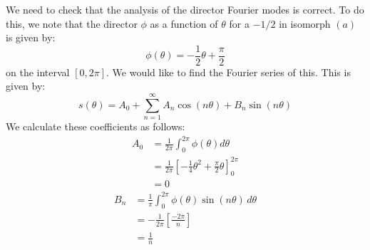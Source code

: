 \documentclass[reqno]{article}
\begin{document}
We need to check that the analysis of the director Fourier modes is correct.
To do this, we note that the director $\phi$ as a function of $\theta$ for a $-1/2$ in isomorph $(a)$ is given by:
\begin{equation}
    \phi(\theta) = -\frac12 \theta + \frac{\pi}{2}
\end{equation}
on the interval $[0, 2\pi]$.
We would like to find the Fourier series of this.
This is given by:
\begin{equation}
    s(\theta)
    =
    A_0
    + \sum_{n = 1}^\infty A_n \cos(n\theta)
    + B_n \sin(n\theta)
\end{equation}
We calculate these coefficients as follows:
\begin{equation}
    \begin{split}
        A_0
        &=
        \frac{1}{2\pi}
        \int_{0}^{2 \pi}
        \phi(\theta)
        d\theta \\
        &=
        \frac{1}{2\pi}
        \left[
            -\frac14 \theta^2
            + \frac{\pi}{2} \theta
        \right]_{0}^{2\pi} \\
        &=
        0
    \end{split}
\end{equation}
\begin{equation}
    \begin{split}
        B_n
        &=
        \frac{1}{\pi}\int_{0}^{2\pi} \phi(\theta) \sin(n \theta) \, d\theta \\
        &=
        -\frac{1}{2\pi} \left[\frac{-2\pi}{n}\right] \\
        &= \frac{1}{n}
    \end{split}
\end{equation}
\end{document}
